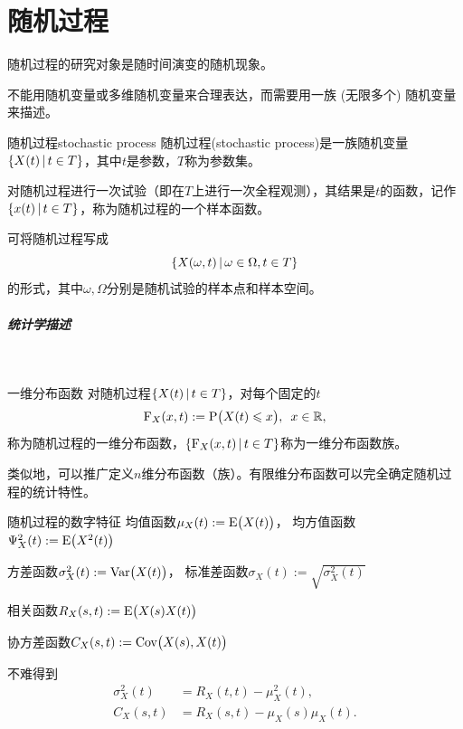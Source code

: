 \chapter{随机过程}
随机过程的研究对象是随时间演变的随机现象。

不能用随机变量或多维随机变量来合理表达，而需要用一族 (无限多个) 随机变量来描述。
\begin{definition}{随机过程}{stochastic process}
	随机过程(stochastic process)是一族随机变量$\{X(t)\,\vert\,t \in T\}$，其中$t$是参数，$T$称为参数集。
\end{definition}
对随机过程进行一次试验（即在$ T $上进行一次全程观测），其结果是$t$的函数，记作$\{x(t)\,\vert\,t \in T\}$，称为随机过程的一个样本函数。

可将随机过程写成
\[
	\{X(\omega,t)\,\vert\,\omega \in \Omega,t \in T\}
\]
的形式，其中$\omega,\Omega$分别是随机试验的样本点和样本空间。
\paragraph{统计学描述}~
\begin{definition}{一维分布函数}{}
	对随机过程$\{X(t)\,\vert\,t \in T\}$，对每个固定的$t$
	\begin{equation}
		\operatorname{F}_X(x,t) := \operatorname{P}\bigl(X(t) \leqslant x\bigr),\enspace x \in \mathbb{R},
	\end{equation}
	称为随机过程的一维分布函数，$\{\operatorname{F}_X(x,t)\,\vert\,t \in T\}$称为一维分布函数族。
\end{definition}
类似地，可以推广定义$n$维分布函数（族）。有限维分布函数可以完全确定随机过程的统计特性。
\begin{definition}{随机过程的数字特征}{}
	均值函数$\mu_X(t) := \operatorname{E}\bigl(X(t)\bigr)$，
	均方值函数$\Psi^2_X(t) := \operatorname{E}\bigl(X^2(t)\bigr)$

	方差函数$\sigma_X^2(t) := \operatorname{Var}\bigl(X(t)\bigr)$，
	标准差函数$\sigma_X(t) := \sqrt{\sigma^2_X(t)}$

	相关函数$R_X(s,t) := \operatorname{E}\bigl(X(s)X(t)\bigr)$

	协方差函数$C_X(s,t) := \operatorname{Cov}\bigl(X(s),X(t)\bigr)$
\end{definition}
不难得到
\begin{equation}\label{eq:ps-covariance-correlation}
    \begin{aligned}
		\sigma_X^2(t) &= R_X(t,t) - \mu_X^2(t),\\
		C_X(s,t) &= R_X(s,t) - \mu_X(s)\mu_X(t).
    \end{aligned}
\end{equation}

